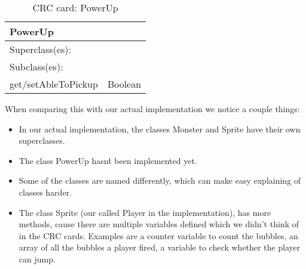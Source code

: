 \begin{table}[]
\centering
\label{crc_powerup}
\begin{tabular}{|l|l|}
\hline
\multicolumn{2}{|l|}{PowerUp} \\ \hline
\multicolumn{2}{|l|}{Superclass(es):} \\ \hline
\multicolumn{2}{|l|}{Subclass(es):} \\ \hline
get/setAbleToPickup           & Boolean \\ \hline
\end{tabular}
\caption{CRC card: PowerUp}
\end{table}

When comparing this with our actual implementation we notice a couple things:
\begin{itemize}
\item In our actual implementation, the classes Monster and Sprite have their own superclasses.
\item The class PowerUp hasn\'t been implemented yet. 
\item Some of the classes are named differently, which can make easy explaining of classes harder. 
\item The class Sprite (our called Player in the implementation), has more methods, cause there are multiple variables defined which we didn't think of in the CRC cards. Examples are a counter variable to count the bubbles, an array of all the bubbles a player fired, a variable to check whether the player can jump. 
\end{itemize}
